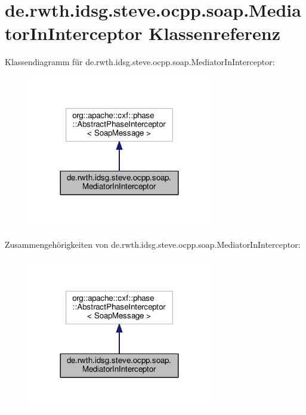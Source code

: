 \hypertarget{classde_1_1rwth_1_1idsg_1_1steve_1_1ocpp_1_1soap_1_1_mediator_in_interceptor}{\section{de.\-rwth.\-idsg.\-steve.\-ocpp.\-soap.\-Mediator\-In\-Interceptor Klassenreferenz}
\label{classde_1_1rwth_1_1idsg_1_1steve_1_1ocpp_1_1soap_1_1_mediator_in_interceptor}
}


Klassendiagramm für de.\-rwth.\-idsg.\-steve.\-ocpp.\-soap.\-Mediator\-In\-Interceptor\-:
\nopagebreak
\begin{figure}[H]
\begin{center}
\leavevmode
\includegraphics[width=228pt]{classde_1_1rwth_1_1idsg_1_1steve_1_1ocpp_1_1soap_1_1_mediator_in_interceptor__inherit__graph}
\end{center}
\end{figure}


Zusammengehörigkeiten von de.\-rwth.\-idsg.\-steve.\-ocpp.\-soap.\-Mediator\-In\-Interceptor\-:
\nopagebreak
\begin{figure}[H]
\begin{center}
\leavevmode
\includegraphics[width=228pt]{classde_1_1rwth_1_1idsg_1_1steve_1_1ocpp_1_1soap_1_1_mediator_in_interceptor__coll__graph}
\end{center}
\end{figure}
